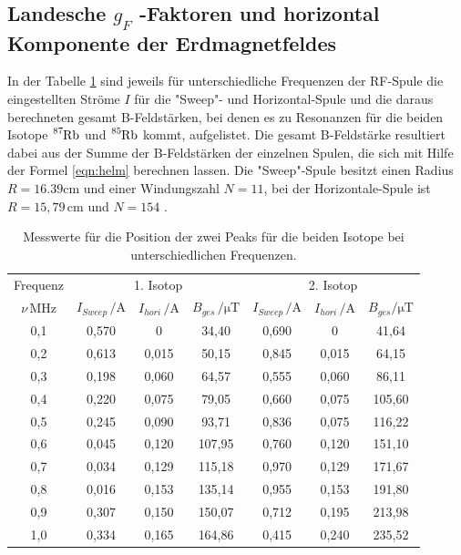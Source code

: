 \subsection{Landesche $g_F$ -Faktoren und horizontal Komponente der Erdmagnetfeldes}
In der Tabelle \ref{tab:messwerte} sind jeweils
für  unterschiedliche Frequenzen der RF-Spule
die eingestellten Ströme $I$ für die "Sweep"- und Horizontal-Spule
und die daraus
berechneten gesamt B-Feldstärken,
bei denen es zu Resonanzen für die beiden Isotope $\ce{^{87}Rb}$ und $\ce{^{85}Rb}$
 kommt, aufgelistet.
Die gesamt  B-Feldstärke resultiert dabei aus
der Summe der B-Feldstärken der
einzelnen Spulen, die sich mit Hilfe der Formel \eqref{eqn:helm}
berechnen lassen.
Die "Sweep"-Spule besitzt einen Radius  $R=16.39\si{\centi\meter}$
und einer Windungszahl $N=11$, bei der Horizontale-Spule ist $R=15,79\,\si{\centi\meter}$
 und $N=154$ .
\FloatBarrier
\begin{table}
\centering
\caption{Messwerte für die Position der zwei Peaks für die beiden Isotope bei unterschiedlichen Frequenzen.}
\label{tab:messwerte}
\begin{tabular}{c| c c c | c c c }
\toprule
Frequenz & \multicolumn{3}{c}{1. Isotop} & \multicolumn{3}{c}{2. Isotop} \\
$\nu \, \si{\mega\hertz}$  & $I_{Sweep} \, \si{\per\ampere}$ &   $I_{hori} \, \si{\per\ampere}$ &  $B_{ges} \, \si{\per\micro\tesla}$ & $I_{Sweep} \, \si{\per\ampere}$
&   $I_{hori} \, \si{\per\ampere} $ & $ B_{ges} \si{\per\micro\tesla}$\\
\midrule
0,1 & 0,570 &  0       & 34,40  & 0,690 & 0      &   41,64 \\
0,2 & 0,613 &  0,015   & 50,15  & 0,845 & 0,015  &   64,15 \\
0,3 & 0,198 &  0,060   & 64,57  & 0,555 & 0,060  &   86,11 \\
0,4 & 0,220 &  0,075   & 79,05  & 0,660 & 0,075  &  105,60 \\
0,5 & 0,245 &  0,090   & 93,71  & 0,836 & 0,075  &  116,22 \\
0,6 & 0,045 &  0,120   & 107,95 & 0,760 & 0,120  &  151,10 \\
0,7 & 0,034 &  0,129   & 115,18 & 0,970 & 0,129  &  171,67 \\
0,8 & 0,016 &  0,153   & 135,14 & 0,955 & 0,153  &  191,80 \\
0,9 & 0,307 &  0,150   & 150,07 & 0,712 & 0,195  &  213,98 \\
1,0 & 0,334 &  0,165   & 164,86 & 0,415 & 0,240  &  235,52 \\
\bottomrule
\end{tabular}
\end{table}

